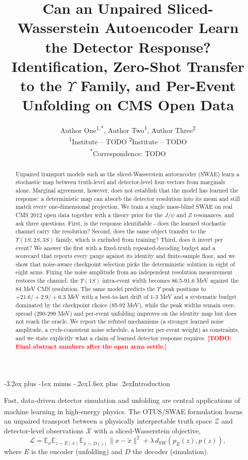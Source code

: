 \documentclass[11pt,a4paper]{article}
\title{\vspace{-2.2em}\bfseries\Large Can an Unpaired Sliced-Wasserstein Autoencoder
Learn the Detector Response?\\[0.35em]
\large Identification, Zero-Shot Transfer to the $\Upsilon$ Family, and Per-Event
Unfolding on CMS Open Data}
\author{Author One\textsuperscript{1,*}, Author Two\textsuperscript{1}, Author Three\textsuperscript{2}\\[0.5em]
\small\textsuperscript{1}Institute -- TODO \quad \textsuperscript{2}Institute -- TODO\\
\small\textsuperscript{*}Correspondence: TODO}
\date{}
\makeatletter
\renewcommand\section{\@startsection{section}{1}{\z@}%
  {-3.2ex plus -1ex minus -.2ex}{1.6ex plus .2ex}{\normalfont\large\bfseries}}
\newcommand{\todo}[1]{\textcolor{red}{\textbf{[TODO: #1]}}}
\makeatother
\begin{document}
\maketitle
\vspace{-1.4em}

\begin{abstract}
\noindent
Unpaired transport models such as the sliced-Wasserstein autoencoder (SWAE) learn a
stochastic map between truth-level and detector-level four-vectors from marginals
alone. Marginal agreement, however, does not establish that the model has learned the
response: a deterministic map can absorb the detector resolution into its mean and
still match every one-dimensional projection. We train a single mass-blind SWAE on
real CMS 2012 open data together with a theory prior for the $J/\psi$ and $Z$
resonances, and ask three questions. First, is the response identifiable - does the
learned stochastic channel carry the resolution? Second, does the same object transfer
to the $\Upsilon(1S,2S,3S)$ family, which is excluded from training? Third, does it
invert per event? We answer the first with a fixed-truth repeated-decoding budget and
a scorecard that reports every gauge against its identity and finite-sample floor, and
we show that noise-aware checkpoint selection picks the deterministic solution in
eight of eight arms. Fixing the noise amplitude from an independent resolution
measurement restores the channel: the $\Upsilon(1S)$ intra-event width becomes
86.5-91.6 MeV against the 84 MeV CMS resolution. The same model predicts the
$\Upsilon$ peak positions to $+21.6/+2.9/+6.3$ MeV with a best-to-last drift of
1-3 MeV and a systematic budget dominated by the checkpoint choice (85-92 MeV), while
the peak widths remain over-spread (290-299 MeV) and per-event unfolding improves on
the identity map but does not reach the oracle. We report the refuted mechanisms (a
stronger learned noise amplitude, a cycle-consistent noise schedule, a heavier
per-event weight) as constraints, and we state explicitly what a claim of learned
detector response requires.
\todo{Final abstract numbers after the open arms settle.}
\end{abstract}

\section{Introduction}

Fast, data-driven detector simulation and unfolding are central applications of
machine learning in high-energy physics\textsuperscript{\cite{otus_paper,calogan}}.
The OTUS/SWAE formulation\textsuperscript{\cite{otus_paper,swae,wae}} learns an
unpaired transport between a physically interpretable truth space $\mathcal{Z}$ and
detector-level observations $\mathcal{X}$ with a sliced-Wasserstein objective,
\begin{equation}
\mathcal{L}
= \mathbb{E}_{x}\mathbb{E}_{z\sim E(x)}\mathbb{E}_{\tilde x\sim D(z)}\|x-\tilde x\|^2
+ \lambda\, d_{\mathrm{SW}}\!\left(p_E(z),p(z)\right),
\end{equation}
where $E$ is the encoder (unfolding) and $D$ the decoder (simulation).
\end{document}
